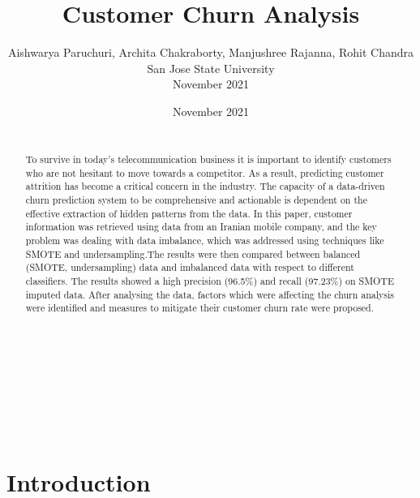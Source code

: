 \documentclass[a4paper, 10pt, conference]{ieeeconf}      %
\title{\LARGE \bf
Customer Churn Analysis}
\author{Aishwarya Paruchuri, Archita Chakraborty, Manjushree Rajanna, Rohit Chandra\\San Jose State University\\ November 2021%
}
\date{November 2021}
\begin{document}
\maketitle
\thispagestyle{empty}
\pagestyle{empty}


\\\
\begin{abstract}
\\
To survive in today’s telecommunication business it is important to identify customers who are not hesitant to move towards a competitor. As a result, predicting customer attrition has become a critical concern in the industry. The capacity of a data-driven churn prediction system to be comprehensive and actionable is dependent on the effective extraction of hidden patterns from the data. In this paper, customer information was retrieved using data from an Iranian mobile company, and the key problem was dealing with data imbalance, which was addressed using techniques like SMOTE and undersampling.The results were then compared between balanced (SMOTE, undersampling) data and imbalanced data with respect to different classifiers. The results showed a high precision (96.5\%) and recall (97.23\%) on SMOTE imputed data. After analysing the data, factors which were affecting the churn analysis were identified and measures to mitigate their customer churn rate were proposed.


\end{abstract}


\\\
\section{\textbf{Introduction}}
\end{document}
